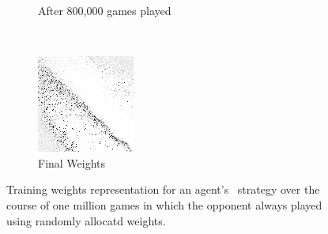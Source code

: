 \begin{figure}
\begin{subfigure}[t]{0.2\textwidth}
	\caption{After 800,000 games played}
	\end{subfigure}
	~
	\begin{subfigure}[t]{0.2\textwidth}
	\includegraphics[width=\textwidth]{images/findings/round2/flipbook/random/checkpoint_999999.png}
	\caption{Final Weights}
	\end{subfigure}

\caption{
	Training weights representation for an agent's \handmaxavg\ strategy
	over the course of one million games
	in which the opponent always played using randomly allocatd weights.
}
\label{fig:r2-flip-random}
\end{figure}

